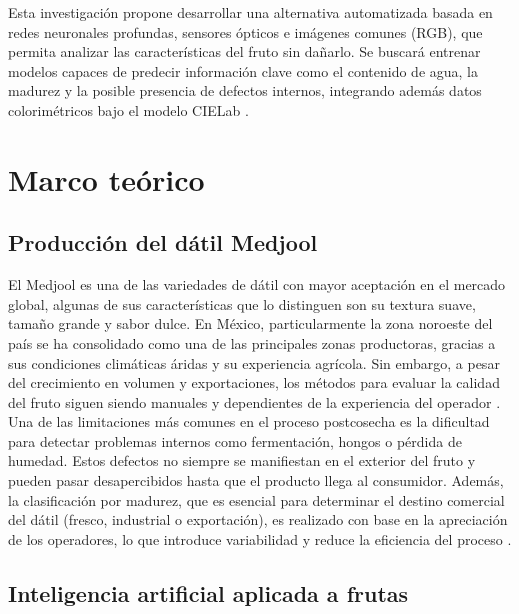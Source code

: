 Esta investigación propone desarrollar una alternativa automatizada basada en redes neuronales profundas, sensores ópticos e imágenes comunes (RGB), que permita analizar las características del fruto sin dañarlo. Se buscará entrenar modelos capaces de predecir información clave como el contenido de agua, la madurez y la posible presencia de defectos internos, integrando además datos colorimétricos bajo el modelo CIELab \parencite{habib_external_2022}.


\section{Marco teórico}

\subsection{Producción del dátil Medjool}

El Medjool es una de las variedades de dátil con mayor aceptación en el mercado global, algunas de sus características que lo distinguen son su textura suave, tamaño grande y sabor dulce. En México, particularmente la zona noroeste del país se ha consolidado como una de las principales zonas productoras, gracias a sus condiciones climáticas áridas y su experiencia agrícola. Sin embargo, a pesar del crecimiento en volumen y exportaciones, los métodos para evaluar la calidad del fruto siguen siendo manuales y dependientes de la experiencia del operador \parencite{salomon-torres_produccion_2017}.\\

Una de las limitaciones más comunes en el proceso postcosecha es la dificultad para detectar problemas internos como fermentación, hongos o pérdida de humedad. Estos defectos no siempre se manifiestan en el exterior del fruto y pueden pasar desapercibidos hasta que el producto llega al consumidor. Además, la clasificación por madurez, que es esencial para determinar el destino comercial del dátil (fresco, industrial o exportación), es realizado con base en la apreciación de los operadores, lo que introduce variabilidad y reduce la eficiencia del proceso \parencite{perez-perez_evaluation_2021}.

\subsection{Inteligencia artificial aplicada a frutas}

